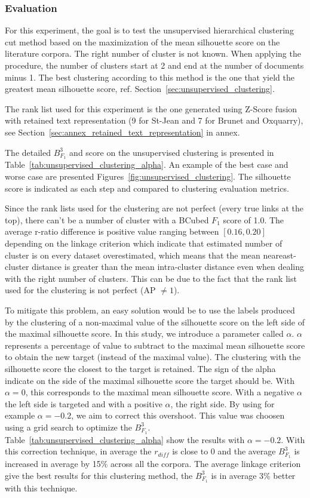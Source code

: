 \subsubsection{Evaluation}

For this experiment, the goal is to test the unsupervised hierarchical clustering cut method based on the maximization of the mean silhouette score on the literature corpora.
The right number of cluster is not known.
When applying the procedure, the number of clusters start at 2 and end at the number of documents minus 1.
The best clustering according to this method is the one that yield the greatest mean silhouette score, ref. Section~\ref{sec:unsupervised_clustering}.

The rank list used for this experiment is the one generated using Z-Score fusion with retained text representation (9 for St-Jean and 7 for Brunet and Oxquarry), see Section~\ref{sec:annex_retained_text_representation} in annex.

The detailed $B^3_{F_1}$ and score on the unsupervised clustering is presented in Table~\ref{tab:unsupervised_clustering_alpha}.
An example of the best case and worse case are presented Figures~\ref{fig:unsupervised_clustering}.
The silhouette score is indicated as each step and compared to clustering evaluation metrics.

Since the rank lists used for the clustering are not perfect (every true links at the top), there can't be a number of cluster with a BCubed $F_1$ score of 1.0.
The average r-ratio difference is positive value ranging between $\left[0.16, 0.20\right]$ depending on the linkage criterion which indicate that estimated number of cluster is on every dataset overestimated, which means that the mean neareast-cluster distance is greater than the mean intra-cluster distance even when dealing with the right number of clusters.
This can be due to the fact that the rank list used for the clustering is not perfect (AP $\neq 1$).

To mitigate this problem, an easy solution would be to use the labels produced by the clustering of a non-maximal value of the silhouette score on the left side of the maximal silhouette score.
In this study, we introduce a parameter called $\alpha$.
$\alpha$ represents a percentage of value to subtract to the maximal mean silhouette score to obtain the new target (instead of the maximal value).
The clustering with the silhouette score the closest to the target is retained.
The sign of the alpha indicate on the side of the maximal silhouette score the target should be.
With $\alpha = 0$, this corresponds to the maximal mean silhouette score.
With a negative $\alpha$ the left side is targeted and with a positive $\alpha$, the right side.
By using for example $\alpha = -0.2$, we aim to correct this overshoot.
This value was choosen using a grid search to optimize the $B^3_{F_1}$.
Table~\ref{tab:unsupervised_clustering_alpha} show the results with $\alpha = -0.2$.
With this correction technique, in average the $r_{diff}$ is close to 0 and the average $B^3_{F_1}$ is increased in average by 15\% across all the corpora.
The average linkage criterion give the best results for this clustering method, the $B^3_{F_1}$ is in average 3\% better with this technique.

